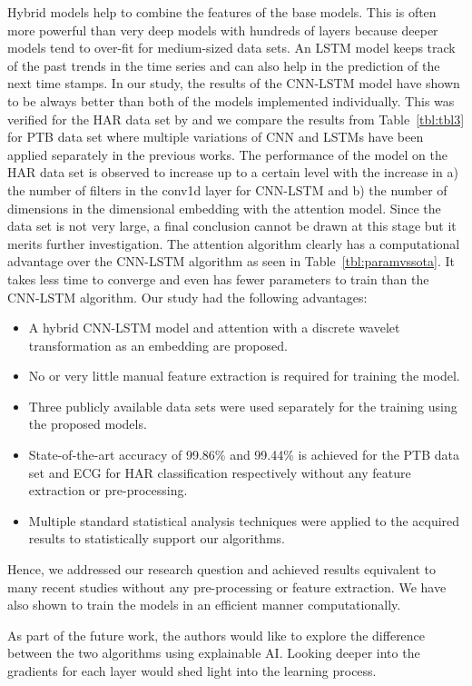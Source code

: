 \documentclass{ieeeaccess}
\begin{document}
Hybrid models help to combine the features of the base models. This is often more powerful than very deep models with hundreds of layers because deeper models tend to over-fit for medium-sized data sets. An LSTM model keeps track of the past trends in the time series and can also help in the prediction of the next time stamps. In our study, the results of the CNN-LSTM model have shown to be always better than both of the models implemented individually. This was verified for the HAR data set by \cite{Pusch} and we compare the results from Table~\ref{tbl:tbl3} for PTB data set where multiple variations of CNN and LSTMs have been applied separately in the previous works.
The performance of the model on the HAR data set is observed to increase up to a certain level with the increase in a) the number of filters in the conv1d layer for CNN-LSTM and b) the number of dimensions in the dimensional embedding with the attention model. Since the data set is not very large, a final conclusion cannot be drawn at this stage but it merits further investigation. 
The attention algorithm clearly has a computational advantage over the CNN-LSTM algorithm as seen in Table~\ref{tbl:paramvssota}. It takes less time to converge and even has fewer parameters to train than the CNN-LSTM algorithm.
Our study had the following advantages:
\begin{itemize}
  \item A hybrid CNN-LSTM model and attention with a discrete wavelet transformation as an embedding are proposed.
  \item No or very little manual feature extraction is required for training the model.
  \item Three publicly available data sets were used separately for the training using the proposed models.
  \item State-of-the-art accuracy of 99.86\% and 99.44\% is achieved for the PTB data set and ECG for HAR classification respectively without any feature extraction or pre-processing.
  \item Multiple standard statistical analysis techniques were applied to the acquired results to statistically support our algorithms.

\end{itemize}
Hence, we addressed our research question and achieved results equivalent to many recent studies without any pre-processing or feature extraction. We have also shown to train the models in an efficient manner computationally.

As part of the future work, the authors would like to explore the difference between the two algorithms using explainable AI. Looking deeper into the gradients for each layer would shed light into the learning process.
\end{document}
